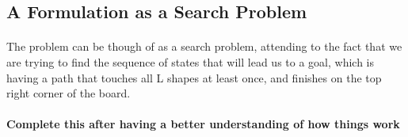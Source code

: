\documentclass{article}
\begin{document}
     \subsection{A Formulation as a Search Problem}

     \paragraph{}The problem can be though of as a search problem, attending to the fact that we are trying to find the sequence of states that will lead us to a goal, which is having a path that touches all L shapes at least once, and finishes on the top right corner of the board.

     \paragraph{}\textbf{Complete this after having a better understanding of how things work}
\end{document}
